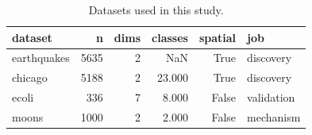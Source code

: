 \begin{table}[t]
\caption{Datasets used in this study.}
\label{tab:datasets}
\begin{tabular}{lrrrrl}
\toprule
dataset & n & dims & classes & spatial & job \\
\midrule
earthquakes & 5635 & 2 & NaN & True & discovery \\
chicago & 5188 & 2 & 23.000 & True & discovery \\
ecoli & 336 & 7 & 8.000 & False & validation \\
moons & 1000 & 2 & 2.000 & False & mechanism \\
\bottomrule
\end{tabular}
\end{table}
